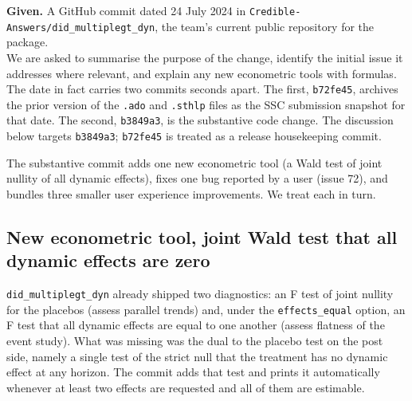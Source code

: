 
\noindent \textbf{Given.} A GitHub commit dated 24 July 2024 in \texttt{Credible-Answers/did\_multiplegt\_dyn}, the team's current public repository for the package.\\

\noindent We are asked to summarise the purpose of the change, identify the initial issue it addresses where relevant, and explain any new econometric tools with formulas.\\

\noindent The date in fact carries two commits seconds apart. The first, \texttt{b72fe45}, archives the prior version of the \texttt{.ado} and \texttt{.sthlp} files as the SSC submission snapshot for that date. The second, \texttt{b3849a3}, is the substantive code change. The discussion below targets \texttt{b3849a3}; \texttt{b72fe45} is treated as a release housekeeping commit.

The substantive commit adds one new econometric tool (a Wald test of joint nullity of all dynamic effects), fixes one bug reported by a user (issue 72), and bundles three smaller user experience improvements. We treat each in turn.

\subsection*{New econometric tool, joint Wald test that all dynamic effects are zero}

 \texttt{did\_multiplegt\_dyn} already shipped two diagnostics: an F test of joint nullity for the placebos (assess parallel trends) and, under the \texttt{effects\_equal} option, an F test that all dynamic effects are equal to one another (assess flatness of the event study). What was missing was the dual to the placebo test on the post side, namely a single test of the strict null that the treatment has no dynamic effect at any horizon. The commit adds that test and prints it automatically whenever at least two effects are requested and all of them are estimable.\\


